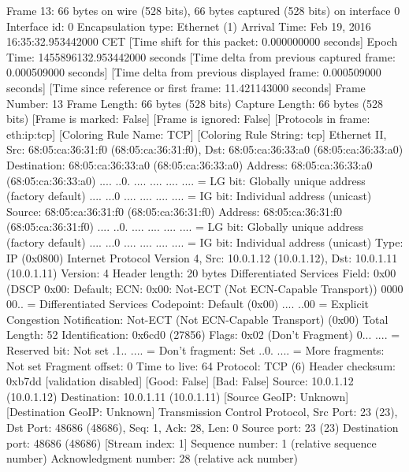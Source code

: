 Frame 13: 66 bytes on wire (528 bits), 66 bytes captured (528 bits) on interface 0
    Interface id: 0
    Encapsulation type: Ethernet (1)
    Arrival Time: Feb 19, 2016 16:35:32.953442000 CET
    [Time shift for this packet: 0.000000000 seconds]
    Epoch Time: 1455896132.953442000 seconds
    [Time delta from previous captured frame: 0.000509000 seconds]
    [Time delta from previous displayed frame: 0.000509000 seconds]
    [Time since reference or first frame: 11.421143000 seconds]
    Frame Number: 13
    Frame Length: 66 bytes (528 bits)
    Capture Length: 66 bytes (528 bits)
    [Frame is marked: False]
    [Frame is ignored: False]
    [Protocols in frame: eth:ip:tcp]
    [Coloring Rule Name: TCP]
    [Coloring Rule String: tcp]
Ethernet II, Src: 68:05:ca:36:31:f0 (68:05:ca:36:31:f0), Dst: 68:05:ca:36:33:a0 (68:05:ca:36:33:a0)
    Destination: 68:05:ca:36:33:a0 (68:05:ca:36:33:a0)
        Address: 68:05:ca:36:33:a0 (68:05:ca:36:33:a0)
        .... ..0. .... .... .... .... = LG bit: Globally unique address (factory default)
        .... ...0 .... .... .... .... = IG bit: Individual address (unicast)
    Source: 68:05:ca:36:31:f0 (68:05:ca:36:31:f0)
        Address: 68:05:ca:36:31:f0 (68:05:ca:36:31:f0)
        .... ..0. .... .... .... .... = LG bit: Globally unique address (factory default)
        .... ...0 .... .... .... .... = IG bit: Individual address (unicast)
    Type: IP (0x0800)
Internet Protocol Version 4, Src: 10.0.1.12 (10.0.1.12), Dst: 10.0.1.11 (10.0.1.11)
    Version: 4
    Header length: 20 bytes
    Differentiated Services Field: 0x00 (DSCP 0x00: Default; ECN: 0x00: Not-ECT (Not ECN-Capable Transport))
        0000 00.. = Differentiated Services Codepoint: Default (0x00)
        .... ..00 = Explicit Congestion Notification: Not-ECT (Not ECN-Capable Transport) (0x00)
    Total Length: 52
    Identification: 0x6cd0 (27856)
    Flags: 0x02 (Don't Fragment)
        0... .... = Reserved bit: Not set
        .1.. .... = Don't fragment: Set
        ..0. .... = More fragments: Not set
    Fragment offset: 0
    Time to live: 64
    Protocol: TCP (6)
    Header checksum: 0xb7dd [validation disabled]
        [Good: False]
        [Bad: False]
    Source: 10.0.1.12 (10.0.1.12)
    Destination: 10.0.1.11 (10.0.1.11)
    [Source GeoIP: Unknown]
    [Destination GeoIP: Unknown]
Transmission Control Protocol, Src Port: 23 (23), Dst Port: 48686 (48686), Seq: 1, Ack: 28, Len: 0
    Source port: 23 (23)
    Destination port: 48686 (48686)
    [Stream index: 1]
    Sequence number: 1    (relative sequence number)
    Acknowledgment number: 28    (relative ack number)

